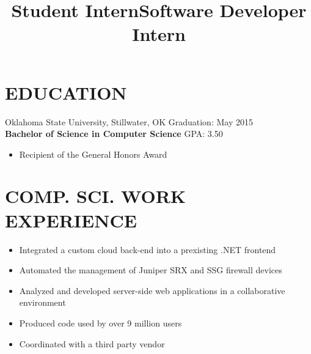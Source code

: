\documentclass[line, overlapped]{res}
\begin{document}
\address{1875 Arbor Valley Dr \\ Edmond, OK 73025 \\ (405) 598-7827 \\ brandon@brandonsilver.com}

\begin{resume}

    \section{EDUCATION}

    Oklahoma State University, Stillwater, OK \hfill Graduation: May 2015 \\
    \textbf{Bachelor of Science in Computer Science} \hfill GPA: 3.50
    \begin{itemize}
        \item Recipient of the General Honors Award
    \end{itemize}


	\section{COMP. SCI. WORK EXPERIENCE} 

    \title{Student Intern}
    \begin{position}
        \begin{itemize}
            \item Integrated a custom cloud back-end into a prexisting .NET frontend
            \item Automated the management of Juniper SRX and SSG firewall devices
    \end{itemize}
    \end{position}

    \title{Software Developer Intern}
    \begin{position}
        \begin{itemize}
            \item Analyzed and developed server-side web applications in a collaborative environment
            \item Produced code used by over 9 million users
            \item Coordinated with a third party vendor
    \end{itemize}
    \end{position} 
 

\end{resume}
\end{document}
